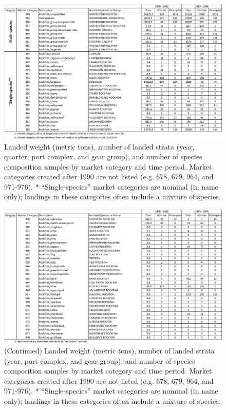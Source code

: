 \documentclass[12pt]{article}
\begin{document}
%
\begin{landscape}
\begin{figure}
\centering
\includegraphics[width=1.3\textwidth]{./pictures/MC_summary_table_part_1.png}
\caption{Landed weight (metric tons), number of landed strata (year, quarter, 
port complex, and gear group), and number of species composition samples by 
market category and time period. Market categories created after 1990 are not 
listed (e.g. 678, 679, 964, and 971-976). * ``Single-species'' market categories 
are nominal (in name only); landings in these categories often include a 
mixture of species.}
\label{ej1}
\end{figure}
\end{landscape}

%
\begin{landscape}
\begin{figure}
\centering
\includegraphics[width=1.3\textwidth]{./pictures/MC_summary_table_part_2.png}
\caption{(Continued) Landed weight (metric tons), number of landed strata (year, 
port complex, and gear group), and number of species composition samples by 
market category and time period. Market categories created after 1990 are not 
listed (e.g. 678, 679, 964, and 971-976). * ``Single-species'' market categories 
are nominal (in name only); landings in these categories often include a 
mixture of species.}
\label{ej2}
\end{figure}
\end{landscape}
\end{document}
